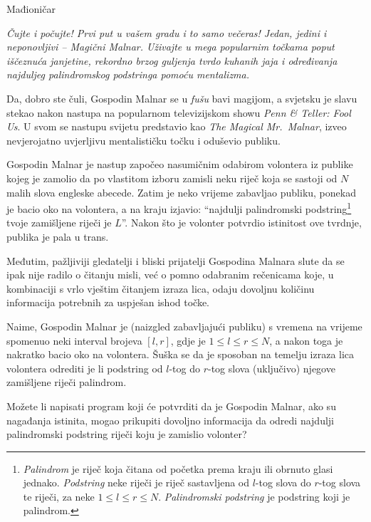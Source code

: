 \begin{statement}[
  problempoints=100,
  timelimit=5 sekundi,
  memorylimit=512 MiB,
]{Mađioničar}

\textit{Čujte i počujte! Prvi put u vašem gradu i to samo večeras! Jedan, jedini i
neponovljivi -- Magični Malnar. Uživajte u mega popularnim točkama poput
iščeznuća janjetine, rekordno brzog guljenja tvrdo kuhanih jaja i određivanja
  najduljeg palindromskog podstringa pomoću mentalizma.}

Da, dobro ste čuli, Gospodin Malnar se u \textit{fušu} bavi magijom, a svjetsku
je slavu stekao nakon nastupa na popularnom televizijskom showu
\textit{Penn \& Teller: Fool Us}. U svom se nastupu svijetu predstavio kao
\textit{The Magical Mr.\ Malnar}, izveo nevjerojatno uvjerljivu mentalističku
točku i oduševio publiku.

Gospodin Malnar je nastup započeo nasumičnim odabirom volontera iz publike kojeg
je zamolio da po vlastitom izboru zamisli neku riječ koja se sastoji od $N$
malih slova engleske abecede. Zatim je neko vrijeme zabavljao publiku, ponekad
je bacio oko na volontera, a na kraju izjavio: ``najdulji palindromski podstring\footnote{
\textit{Palindrom} je riječ koja čitana od početka prema kraju ili obrnuto glasi jednako. \textit{Podstring} neke riječi je riječ sastavljena od $l$-tog slova do $r$-tog slova te riječi, za neke $1 \leq l \leq r \leq N$. \textit{Palindromski podstring} je podstring koji je palindrom.
}
tvoje zamišljene riječi je $L$''. Nakon što je volonter potvrdio istinitost ove
tvrdnje, publika je pala u trans.

Međutim, pažljiviji gledatelji i bliski prijatelji Gospodina Malnara slute da
se ipak nije radilo o čitanju misli, već o pomno odabranim rečenicama koje, u
kombinaciji s vrlo vještim čitanjem izraza lica, odaju dovoljnu količinu
informacija potrebnih za uspješan ishod točke.

Naime, Gospodin Malnar je (naizgled zabavljajući publiku) s vremena na vrijeme
spomenuo neki interval brojeva $[l, r]$, gdje je $1 \le l \le r \le N$, a
nakon toga je nakratko bacio oko na volontera. Šuška se da je sposoban na
temelju izraza lica volontera odrediti je li podstring od $l$-tog do $r$-tog
slova (uključivo) njegove zamišljene riječi palindrom.

Možete li napisati program koji će potvrditi da je Gospodin Malnar, ako su
nagađanja istinita, mogao prikupiti dovoljno informacija da odredi najdulji
palindromski podstring riječi koju je zamislio volonter?


\end{statement}
